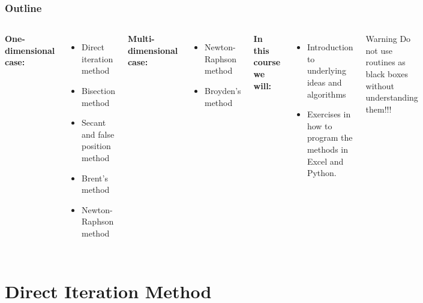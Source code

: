 \begin{frame}[fragile]
  \frametitle{Outline}
  \begin{columns}
    \textbf{One-dimensional case:}
    \begin{itemize}
      \item Direct iteration method
      \item Bisection method
      \item Secant and false position method
      \item Brent's method
      \item Newton-Raphson method
    \end{itemize}
    \vspace{0.15cm}
    \textbf{Multi-dimensional case:}
    \begin{itemize}
      \item Newton-Raphson method
      \item Broyden's method
    \end{itemize}
    \pause
    \textbf{In this course we will:}
    \begin{itemize}
      \item Introduction to underlying ideas and algorithms
      \item Exercises in how to program the methods in Excel and Python.
    \end{itemize}
    \pause
    \begin{block}{Warning}
      Do not use routines as black boxes without understanding them!!!
    \end{block}
  \end{columns}
\end{frame}

\section{Direct Iteration Method}
